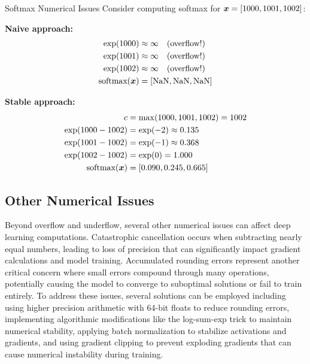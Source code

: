 \begin{examplebox}{Softmax Numerical Issues}
Consider computing softmax for $\boldsymbol{x} = [1000, 1001, 1002]$:

\textbf{Naive approach:}
\begin{align}
\exp(1000) &\approx \infty \quad \text{(overflow!)} \\
\exp(1001) &\approx \infty \quad \text{(overflow!)} \\
\exp(1002) &\approx \infty \quad \text{(overflow!)} \\
\text{softmax}(\boldsymbol{x}) &= [\text{NaN}, \text{NaN}, \text{NaN}]
\end{align}

\textbf{Stable approach:}
\begin{align}
c &= \max(1000, 1001, 1002) = 1002 \\
\exp(1000-1002) &= \exp(-2) \approx 0.135 \\
\exp(1001-1002) &= \exp(-1) \approx 0.368 \\
\exp(1002-1002) &= \exp(0) = 1.000 \\
\text{softmax}(\boldsymbol{x}) &= [0.090, 0.245, 0.665]
\end{align}

\begin{center}
\end{center}
\end{examplebox}

\subsection{Other Numerical Issues}

Beyond overflow and underflow, several other numerical issues can affect deep learning computations. Catastrophic cancellation occurs when subtracting nearly equal numbers, leading to loss of precision that can significantly impact gradient calculations and model training. Accumulated rounding errors represent another critical concern where small errors compound through many operations, potentially causing the model to converge to suboptimal solutions or fail to train entirely. To address these issues, several solutions can be employed including using higher precision arithmetic with 64-bit floats to reduce rounding errors, implementing algorithmic modifications like the log-sum-exp trick to maintain numerical stability, applying batch normalization to stabilize activations and gradients, and using gradient clipping to prevent exploding gradients that can cause numerical instability during training.
